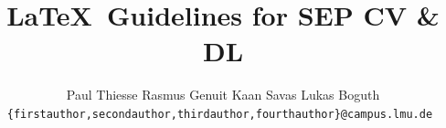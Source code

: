 \documentclass[10pt,twocolumn,letterpaper]{article}
\title{\LaTeX\ Guidelines for SEP CV \& DL}
\author{Paul Thiesse
\quad
Rasmus Genuit
\quad
Kaan Savas
\quad
Lukas Boguth\\
\tt\small\{firstauthor,secondauthor,thirdauthor,fourthauthor\}@campus.lmu.de
}
\begin{document}
\maketitle
    


{
    \small
    
    
}

% 
\end{document}
